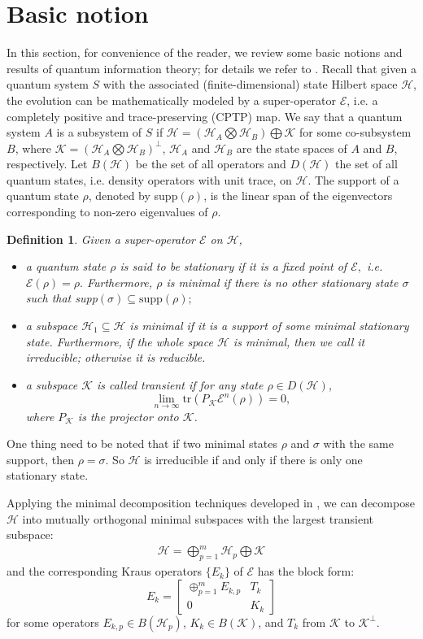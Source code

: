 \documentclass[journal]{IEEEtran}
\def\h{\ensuremath{\mathcal{H}}}
\def\k{\ensuremath{\mathcal{K}}}
\def\e{\ensuremath{\mathcal{E}}}
\def\k{\mathcal{K}}
\newtheorem{definition}{Definition}
\begin{document}
\section{Basic notion}
In this section, for convenience of the reader, we review some basic notions and results of quantum information theory; for details we refer to \cite{nielsen2010quantum}. Recall that given a quantum system $S$ with the associated (finite-dimensional) state Hilbert space $\h$, the evolution can be mathematically  modeled by a super-operator $\e$, i.e. a completely positive  and trace-preserving (CPTP) map.  We say that a quantum system $A$ is a subsystem of $S$ if $\h=(\h_A\bigotimes\h_B)\bigoplus \k$ for some co-subsystem $B$, where $\k=(\h_A\bigotimes\h_B)^\perp$, $\h_A$ and $\h_B$ are the state spaces  of $A$ and $B$, respectively.  
  Let $B(\h)$ be the set of all  operators and $D(\h)$ the set of all quantum states, i.e. density operators with unit trace, on $\h$.  The support of a quantum state $\rho$, denoted by supp$(\rho)$, is the linear span of the eigenvectors corresponding to non-zero eigenvalues of $\rho.$ 
\begin{definition}
  Given a super-operator $\e$ on $\h$, 
  \begin{itemize}
    \item[(1)] a quantum state  $\rho$ is said to be stationary if it is a fixed point of $\e,$ i.e. $\e(\rho)=\rho.$ Furthermore, $\rho$ is minimal if there is no other stationary state $\sigma$ such that supp$(\sigma)\subseteq \textrm{supp}(\rho);$
    \item[(2)] a subspace $\h_1\subseteq \h$ is minimal if it is a support of some minimal stationary state. Furthermore, if the whole space $\h$ is minimal, then we call it irreducible; otherwise it is reducible.
    \item[(3)] a subspace $\k$ is called transient if for any state $\rho\in D(\h)$, $$\lim_{n\rightarrow \infty}\textrm{tr}(P_\k\e^n(\rho))=0,$$ where $P_\k$ is the projector onto $\k$. 
  \end{itemize} 
\end{definition}

One thing need to be noted that if two minimal states $\rho$ and $\sigma$ with the same support, then $\rho=\sigma$. So $\h$ is irreducible if and only if there is only one stationary state.


Applying the minimal decomposition techniques developed in \cite{ying2013reachability,baumgartner2012structure}, we can decompose $\h$ into mutually orthogonal minimal subspaces with the largest transient subspace: 
\begin{eqnarray}\label{eq_mini_dec}
  \h=\bigoplus_{p=1}^m\h_p\bigoplus\k
\end{eqnarray}
and the corresponding Kraus operators $\{E_k\}$ of $\e$ has the block form:
$$E_k=\left[\begin{matrix}
  \oplus_{p=1}^m E_{k,p} & T_k\\
0&K_k
\end{matrix}\right]$$
 for some operators $E_{k,p}\in B(\h_p)$, $K_k\in B(\k)$, and $T_k$ from $\k$ to $\k^\perp$. 
\end{document}
